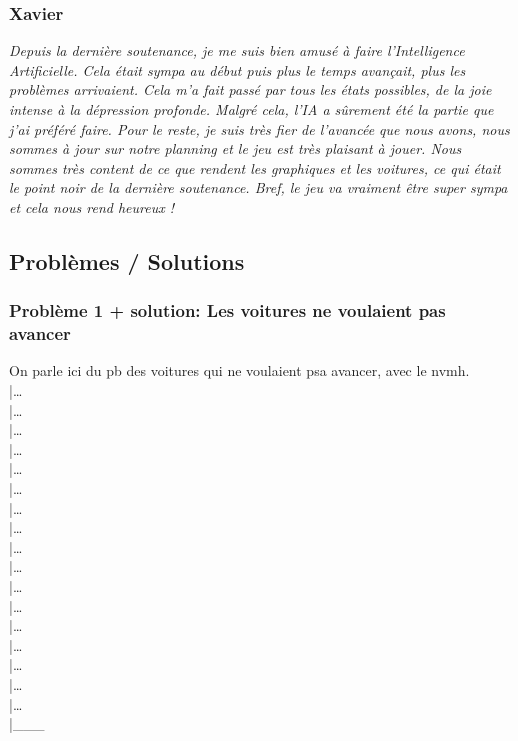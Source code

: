\documentclass[12pt,a4paper]{article}
\newcommand{\AI}{Intelligence Artificielle}
\begin{document}
            \subsubsection{Xavier}
                \textit{Depuis la dernière soutenance, je me suis bien amusé à faire l'\AI.
                Cela était sympa au début puis plus le temps avançait, plus les problèmes arrivaient.
                Cela m'a fait passé par tous les états possibles, de la joie intense à la dépression
                profonde. Malgré cela, l'IA a sûrement été la partie que j'ai préféré faire.
                Pour le reste, je suis très fier de l'avancée que nous avons, nous sommes à jour sur notre
                planning et le jeu est très plaisant à jouer. Nous sommes très content de ce que rendent
                les graphiques et les voitures, ce qui était le point noir de la dernière soutenance.
                Bref, le jeu va vraiment être super sympa et cela nous rend heureux ! }
                


        \clearpage
        \subsection{Problèmes / Solutions}

            \subsubsection{Problème 1 + solution: Les voitures ne voulaient pas avancer}
                On parle ici du pb des voitures qui ne voulaient psa avancer, avec le nvmh.\\
                |\dots\\|\dots\\|\dots\\|\dots\\|\dots\\|\dots\\|\dots\\|\dots\\|\dots\\
                |\dots\\|\dots\\|\dots\\|\dots\\|\dots\\|\dots\\|\dots\\|\dots\\|\_\_\_\\
\end{document}
